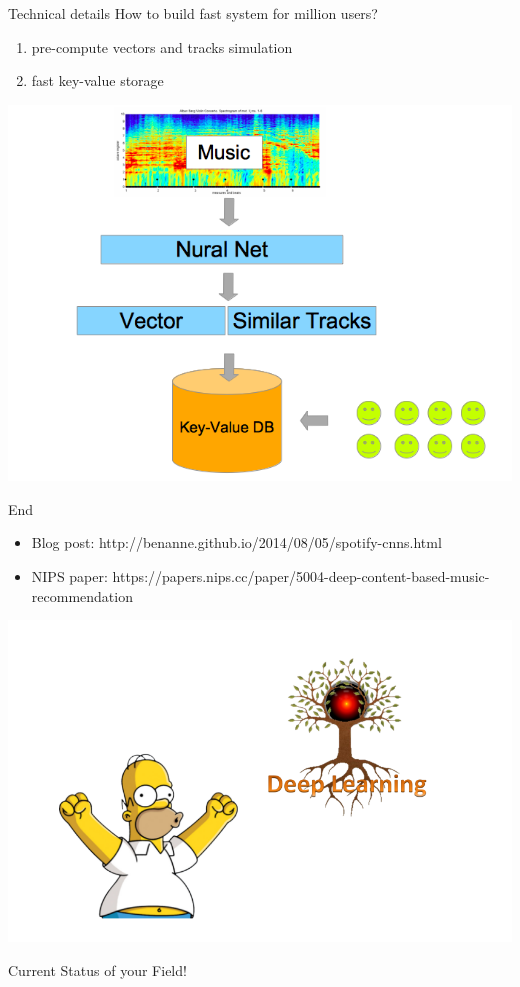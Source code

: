 \documentclass{beamer}
\begin{document}
\begin{frame}{Technical details} 
	 How to build fast system for million users?
	\begin{enumerate}
		  \item pre-compute vectors and tracks simulation 
		  \item fast key-value storage
	\end{enumerate}
		 \begin{center}				
			\includegraphics[scale=0.35]{img/prod}
		\end{center}
\end{frame}
	
\begin{frame}{End} 
	\begin{itemize}
		\item Blog post: http://benanne.github.io/2014/08/05/spotify-cnns.html
		\item NIPS paper: https://papers.nips.cc/paper/5004-deep-content-based-music-recommendation 
	\end{itemize}
	 
	\begin{center}				
		\includegraphics[scale=0.3]{img/csf}
	
		{\huge Current Status of your Field!}
	\end{center}
\end{frame}
\end{document}
